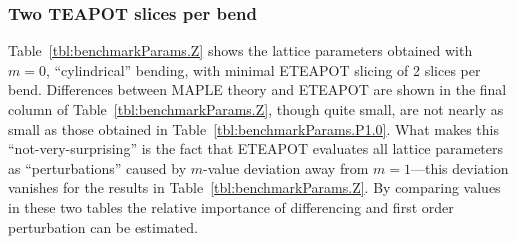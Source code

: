 \documentclass[12pt]{article}
\begin{document}
\subsubsection{Two TEAPOT slices per bend}
Table~\ref{tbl:benchmarkParams.Z} shows the lattice parameters obtained
with $m=0$, ``cylindrical'' bending, with minimal ETEAPOT slicing of 2 slices 
per bend. Differences between MAPLE theory and ETEAPOT are shown in the final column
of Table~\ref{tbl:benchmarkParams.Z}, though quite small, are not nearly as small
as those obtained in Table~\ref{tbl:benchmarkParams.P1.0}. What makes this 
``not-very-surprising'' is the fact that ETEAPOT evaluates all lattice parameters 
as ``perturbations'' caused by $m$-value deviation away from $m=1$---this deviation 
vanishes for the results in Table~\ref{tbl:benchmarkParams.Z}. By comparing values 
in these two tables the relative importance of differencing and first order 
perturbation can be estimated.
\end{document}
